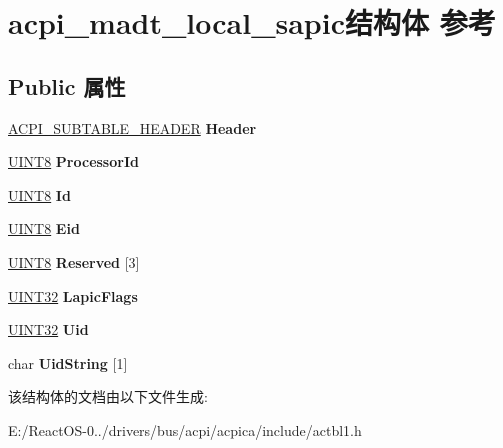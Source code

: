 \hypertarget{structacpi__madt__local__sapic}{}\section{acpi\+\_\+madt\+\_\+local\+\_\+sapic结构体 参考}
\label{structacpi__madt__local__sapic}
\subsection*{Public 属性}
\begin{DoxyCompactItemize}
\item 
\mbox{\label{structacpi__madt__local__sapic_a868e13a453d59aa4f3f87fec0736bf73}} 
\hyperlink{structacpi__subtable__header}{A\+C\+P\+I\+\_\+\+S\+U\+B\+T\+A\+B\+L\+E\+\_\+\+H\+E\+A\+D\+ER} {\bfseries Header}
\item 
\mbox{\label{structacpi__madt__local__sapic_a6dc5bb3d3ea8803332073a5266c7d26b}} 
\hyperlink{_processor_bind_8h_ab27e9918b538ce9d8ca692479b375b6a}{U\+I\+N\+T8} {\bfseries Processor\+Id}
\item 
\mbox{\label{structacpi__madt__local__sapic_a52fdf2195549e86800fd4213c9592a9d}} 
\hyperlink{_processor_bind_8h_ab27e9918b538ce9d8ca692479b375b6a}{U\+I\+N\+T8} {\bfseries Id}
\item 
\mbox{\label{structacpi__madt__local__sapic_abfc641befcab1cbeb2f9f732a214abc5}} 
\hyperlink{_processor_bind_8h_ab27e9918b538ce9d8ca692479b375b6a}{U\+I\+N\+T8} {\bfseries Eid}
\item 
\mbox{\label{structacpi__madt__local__sapic_a4e1715d814b3c5edd530f5724fe977bb}} 
\hyperlink{_processor_bind_8h_ab27e9918b538ce9d8ca692479b375b6a}{U\+I\+N\+T8} {\bfseries Reserved} \mbox{[}3\mbox{]}
\item 
\mbox{\label{structacpi__madt__local__sapic_a49c2a8d0e574865f4a46f094d9a27034}} 
\hyperlink{_processor_bind_8h_ae1e6edbbc26d6fbc71a90190d0266018}{U\+I\+N\+T32} {\bfseries Lapic\+Flags}
\item 
\mbox{\label{structacpi__madt__local__sapic_aca823aaab5a8d63d3de6e88a654ef279}} 
\hyperlink{_processor_bind_8h_ae1e6edbbc26d6fbc71a90190d0266018}{U\+I\+N\+T32} {\bfseries Uid}
\item 
\mbox{\label{structacpi__madt__local__sapic_a807242eb214bb1e04bde5e9ab2466351}} 
char {\bfseries Uid\+String} \mbox{[}1\mbox{]}
\end{DoxyCompactItemize}


该结构体的文档由以下文件生成\+:\begin{DoxyCompactItemize}
\item 
E\+:/\+React\+O\+S-\/0../drivers/bus/acpi/acpica/include/actbl1.\+h\end{DoxyCompactItemize}
